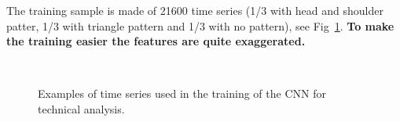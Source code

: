 The training sample is made of 21600 time series (1/3 with head and shoulder patter, 1/3 with triangle pattern and 1/3 with no pattern), see Fig~\ref{fig:patterns}. \textbf{To make the training easier the features are quite exaggerated.}

\begin{figure}[htbp]
	\centering
	\\
	\caption{Examples of time series used in the training of the CNN for technical analysis.}
	\label{fig:patterns}
\end{figure}

